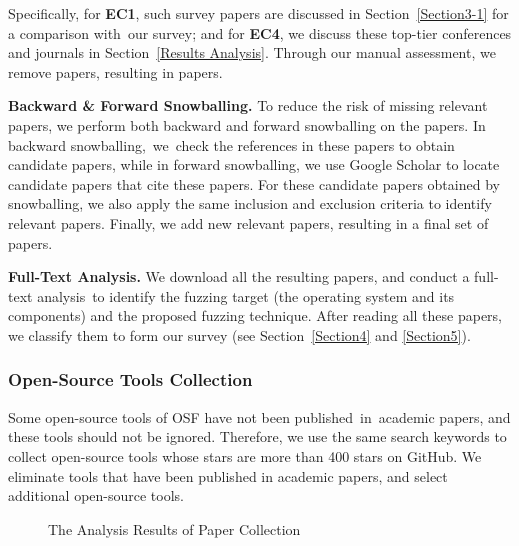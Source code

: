 Specifically, for \textbf{EC1}, such survey papers are discussed in Section~\ref{Section3-1} for a comparison with~our survey; %
and for \textbf{EC4}, we discuss these top-tier conferences and journals in Section~\ref{Results Analysis}. Through our manual assessment, we remove  papers, resulting in  papers.

\textbf{Backward \& Forward Snowballing.} To reduce the risk of missing relevant papers, we perform both backward and forward snowballing \cite{wohlin2014guidelines} on the  papers. In backward snowballing,~we~check the references in these papers to obtain candidate papers, while in forward snowballing, we use Google Scholar to locate candidate papers that cite these papers. For these candidate papers obtained by snowballing, we also apply the same inclusion and exclusion criteria to identify relevant papers. Finally, we add  new relevant papers, resulting in a final set of  papers.

\textbf{Full-Text Analysis.} We download all the resulting  papers, and conduct a full-text analysis~to
 identify the fuzzing target (\ie the operating system and its components) and the proposed fuzzing technique. After reading all these papers, we classify them to form our survey (see Section~\ref{Section4} and \ref{Section5}). 


\subsubsection{Open-Source Tools Collection} Some open-source tools of OSF have not been published~in~academic papers, and these tools should not be ignored. Therefore, we use the same search keywords to collect open-source tools whose stars are more than 400 stars on GitHub. We eliminate tools that have been published in academic papers, and select  additional open-source tools.


\begin{figure*}[!t]
  \centering
  \hspace{20pt}
  \caption{The Analysis Results of Paper Collection}
\end{figure*}



